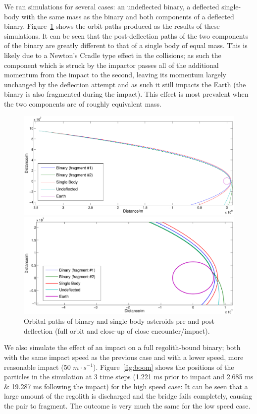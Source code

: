 \documentclass[letterpaper, preprint, paper,11pt]{AAS}	%
\begin{document}
We ran simulations for several cases: an undeflected binary, a deflected single-body with the same mass as the binary and both components of a deflected binary. Figure~\ref{fig:bouncey} shows the orbit paths produced as the results of these simulations. It can be seen that the post-deflection paths of the two components of the binary are greatly different to that of a single body of equal mass. This is likely due to a Newton's Cradle type effect in the collisions; as such the component which is struck by the impactor passes all of the additional momentum from the impact to the second, leaving its momentum largely unchanged by the deflection attempt and as such it still impacts the Earth (the binary is also fragmented during the impact). This effect is most prevalent when the two components are of roughly equivalent mass.
\begin{figure}[H]
\centering
\centerline{\includegraphics[width=1.2\textwidth]{deflection_1.eps}}
\centerline{\includegraphics[width=1.2\textwidth]{deflection_0.eps}} 
\caption{Orbital paths of binary and single body asteroids pre and post deflection (full orbit and close-up of close encounter/impact).} 
\label{fig:bouncey}
\end{figure} 

We also simulate the effect of an impact on a full regolith-bound binary; both with the same impact speed as the previous case and with a lower speed, more reasonable impact (50 $m\cdot s^{-1}$). Figure~\ref{fig:boom} shows the positions of the particles in the simulation at 3 time steps (1.221 ms prior to impact and 2.685 ms  \& 19.287 ms following the impact) for the high speed case: It can be seen that a large amount of the regolith is discharged and the bridge fails completely, causing the pair to fragment. The outcome is very much the same for the low speed case. 
\end{document}
